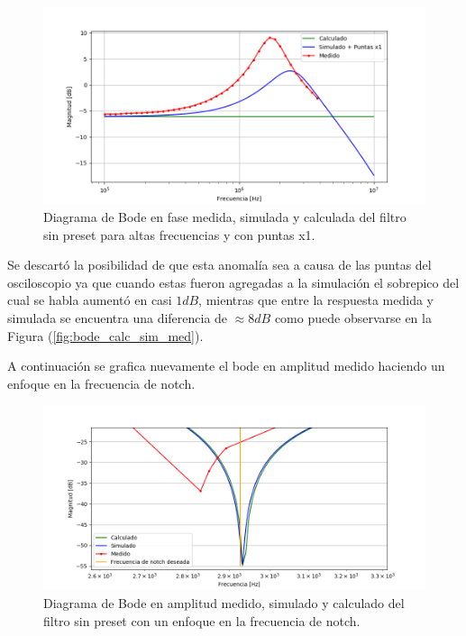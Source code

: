 \begin{figure}[H]
	\centering
	\includegraphics[width=\textwidth]{Imagenes/bode_calc_sim_med_highf.PNG}
	\caption{Diagrama de Bode en fase medida, simulada y calculada del filtro sin preset para altas frecuencias y con puntas x1.}
	\label{fig:bodefase_calc_sim_med_highf}
\end{figure}

Se descartó la posibilidad de que esta anomalía sea a causa de las puntas del osciloscopio ya que cuando estas fueron agregadas a la simulación el sobrepico del cual se habla aumentó en casi $1dB$, mientras que entre la respuesta medida y simulada se encuentra una diferencia de $\approx 8dB$ como puede observarse en la Figura (\ref{fig:bode_calc_sim_med}).

A continuación se grafica nuevamente el bode en amplitud medido haciendo un enfoque en la frecuencia de notch.

\begin{figure}[H]
	\centering
	\includegraphics[width=\textwidth]{Imagenes/bode_calc_sim_med_notch.PNG}
	\caption{Diagrama de Bode en amplitud medido, simulado y calculado del filtro sin preset con un enfoque en la frecuencia de notch.}
	\label{fig:bodefase_calc_sim_med_notch}
\end{figure}

